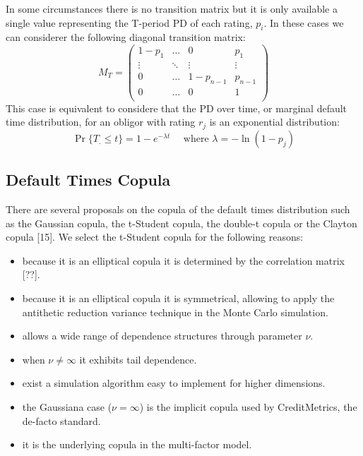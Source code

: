 \documentclass[11pt,fleqn]{book} %
\begin{document}
In some circumstances there is no transition matrix but it is only available
a single value representing the T-period PD of each rating, $p_i$. In these 
cases we can considerer the following diagonal transition matrix:
\begin{displaymath}
	M_T = \left(
	\begin{array}{cccc}
		1-p_1  & \dots  & 0         & p_1     \\
		\vdots & \ddots & \vdots    & \vdots  \\
		0      & \dots  & 1-p_{n-1} & p_{n-1} \\
		0      & \dots  & 0         & 1       \\
	\end{array}
	\right)
\end{displaymath}
This case is equivalent to considere that the PD over time, or marginal default
time distribution, for an obligor with rating $r_j$ is an exponential 
distribution:
\begin{displaymath}
	\Pr\{T_. \le t\} = 1 - e^{-\lambda t} 
	\quad \text{ where } \lambda = -\ln(1-p_j)
\end{displaymath}


\subsection{Default Times Copula}

There are several proposals on the copula of the default times
distribution such as the Gaussian copula, the t-Student copula, 
the double-t copula or the Clayton copula [15]. We select the
t-Student copula for the following reasons:

\begin{itemize}
	\item because it is an elliptical copula it is determined by the correlation matrix [??].
	\item because it is an elliptical copula it is symmetrical, allowing to 
	apply the antithetic reduction variance technique in the Monte Carlo 
	simulation.
	\item allows a wide range of dependence structures through parameter $\nu$.
	\item when $\nu \ne \infty$ it exhibits tail dependence.
	\item exist a simulation algorithm easy to implement for higher dimensions.
	\item the Gaussiana case ($\nu = \infty$) is the implicit copula used by 
	CreditMetrics\texttrademark, the de-facto standard.
	\item it is the underlying copula in the multi-factor model.
\end{itemize}
\end{document}
